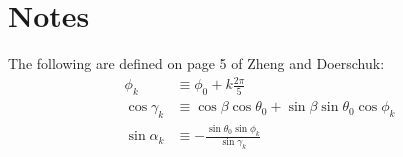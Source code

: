 \documentclass[letterpaper,twocolumn,amsmath,amssymb,pre]{revtex4-1}
\begin{document}
\section{Notes}

The following are defined on page 5 of Zheng and Doerschuk:
\begin{align}
  \phi_k &\equiv \phi_0 + k \frac{2\pi}{5} \\
  \cos \gamma_k &\equiv \cos\beta\cos\theta_0 + \sin\beta
  \sin\theta_0\cos \phi_k \\
  \sin \alpha_k &\equiv - \frac{\sin\theta_0 \sin\phi_k}{\sin\gamma_k}
\end{align}
\end{document}
